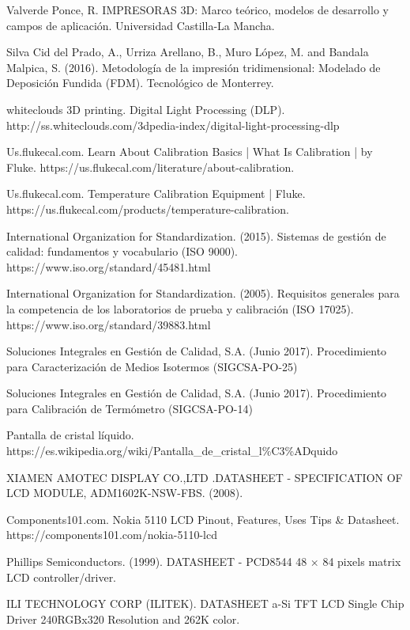 \begin{thebibliography}{9}
Valverde Ponce, R. IMPRESORAS 3D: Marco teórico, modelos de desarrollo y campos de aplicación. Universidad Castilla-La Mancha. 

Silva Cid del Prado, A., Urriza Arellano, B., Muro López, M. and Bandala Malpica, S. (2016). Metodología de la impresión tridimensional: Modelado de Deposición Fundida (FDM). Tecnológico de Monterrey.

whiteclouds 3D printing. Digital Light Processing (DLP). http://ss.whiteclouds.com/3dpedia-index/digital-light-processing-dlp

Us.flukecal.com. Learn About Calibration Basics | What Is Calibration | by Fluke. https://us.flukecal.com/literature/about-calibration.

Us.flukecal.com. Temperature Calibration Equipment | Fluke. https://us.flukecal.com/products/temperature-calibration.

International Organization for Standardization. (2015). Sistemas de gestión de calidad: fundamentos y vocabulario (ISO 9000).  
https://www.iso.org/standard/45481.html

International Organization for Standardization. (2005). Requisitos generales para la competencia de los laboratorios de prueba y calibración (ISO 17025).  
https://www.iso.org/standard/39883.html

Soluciones Integrales en Gestión de Calidad, S.A. (Junio 2017). Procedimiento para Caracterización de Medios
Isotermos (SIGCSA-PO-25)

Soluciones Integrales en Gestión de Calidad, S.A. (Junio 2017). Procedimiento para Calibración de Termómetro (SIGCSA-PO-14)

Pantalla de cristal líquido.  https://es.wikipedia.org/wiki/Pantalla\_de\_cristal\_l\%C3\%ADquido 

XIAMEN AMOTEC DISPLAY CO.,LTD .DATASHEET - SPECIFICATION OF LCD MODULE, ADM1602K-NSW-FBS. (2008).

Components101.com. Nokia 5110 LCD Pinout, Features, Uses Tips \& Datasheet. https://components101.com/nokia-5110-lcd

Phillips Semiconductors. (1999). DATASHEET - PCD8544 48 × 84 pixels matrix LCD controller/driver.

ILI TECHNOLOGY CORP (ILITEK). DATASHEET a-Si TFT LCD Single Chip Driver 240RGBx320 Resolution and 262K color.


\end{thebibliography}
